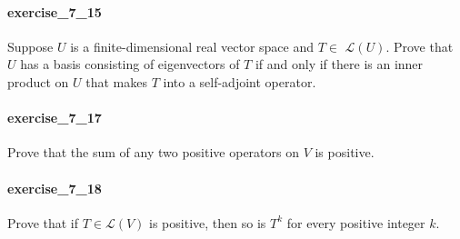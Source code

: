 \documentclass{article}
\begin{document}
\paragraph{exercise\_7\_15} Suppose $U$ is a finite-dimensional real vector space and $T \in$ $\mathcal{L}(U)$. Prove that $U$ has a basis consisting of eigenvectors of $T$ if and only if there is an inner product on $U$ that makes $T$ into a self-adjoint operator.

\paragraph{exercise\_7\_17} Prove that the sum of any two positive operators on $V$ is positive.

\paragraph{exercise\_7\_18} Prove that if $T \in \mathcal{L}(V)$ is positive, then so is $T^{k}$ for every positive integer $k$.
\end{document}
